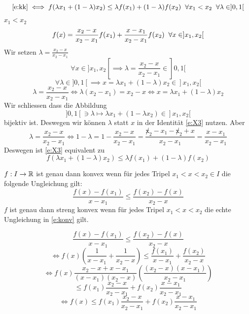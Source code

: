 \begin{Lem}
  \[\eqref{e:kk}\iff f(\lambda x_1+(1-\lambda)x_2)\leq\lambda f(x_1)+(1-\lambda)f(x_2)\hspace{2mm}\forall x_1 < x_2\hspace{2mm}\forall \lambda\in ]0,1[\]
\end{Lem}
\begin{Bew}
  $x_1<x_2$
\begin{equation}\label{e:X3}
f(x)=\frac{x_2-x}{x_2-x_1}f(x_1)+\frac{x-x_1}{x_2-x_1}f(x_2)\hspace{2mm}
\forall x\in ]x_1,x_2[
\end{equation}
Wir setzen $\lambda = \frac{x_2-x}{x_2-x_1}$
  \[\forall x\in ]x_1,x_2[\implies \lambda=\frac{x_2-x}{x_2-x_1}\in ]0,1[\]
  \[\forall \lambda\in ]0,1[\implies x=\lambda x_1+(1-\lambda)x_2\in ]x_1,x_2[\]
  \[\lambda=\frac{x_2-x}{x_2-x_1}\iff \lambda(x_2-x_1)=x_2-x\iff x=\lambda x_1+(1-\lambda)x_2\]
Wir schliessen dass die Abbildung
  \[ ]0,1[\ni\lambda\mapsto \lambda x_1+(1-\lambda x_2)\in  ]x_1,x_2[\]
bijektiv ist. Deswegen wir k\"onnen $\lambda$ statt $x$ in der Identit\"at \eqref{e:X3}
nutzen.
Aber 
\[\lambda=\frac{x_2-x}{x_2-x_1}\iff 1-\lambda=1-\frac{x_2-x}{x_2-x_1}
=\frac{\not x_2-x_1-\not x_2+x}{x_2-x_1}=\frac{x-x_1}{x_2-x_1}\]
Deswegen ist \eqref{e:X3} equivalent zu
  \[f(\lambda x_1+(1-\lambda)x_2)\leq \lambda f(x_1)+(1-\lambda)f(x_2)\]
\end{Bew}
\begin{Lem}\label{l:1011293}
  $f:I\to \mathbb{R}$ ist genau dann konvex wenn für jedes Tripel $x_1<x<x_2\in I$ die folgende Ungleichung gilt:
\begin{equation}\label{e:konv}
\frac{f(x)-f(x_1)}{x-x_1}\leq \frac{f(x_2)-f(x)}{x_2-x}
\end{equation}
$f$ ist genau dann streng konvex wenn f\"ur jedes Tripel $x_1<x<x_2$ die echte Ungleichung
in \eqref{e:konv} gilt.
\end{Lem}
\begin{Bew}
  \[\frac{f(x)-f(x_1)}{x-x_1}\leq \frac{f(x_2)-f(x)}{x_2-x}\]
  \[\iff f(x)\left( \frac{1}{x-x_1}+\frac{1}{x_2-x} \right)\leq \frac{f(x_1)}{x-x_1}+\frac{f(x_2)}{x_2-x}\]
  \[\iff f(x)\frac{x_2-x+x-x_1}{(x-x_1)(x_2-x)}\left( \frac{(x_2-x)(x-x_1)}{x_2-x_1} \right)\]
  \[ \leq f(x_1)\frac{x_2-x}{x_2-x_1}+f(x_2)\frac{x-x_1}{x_2-x_1}\]
  \[\iff f(x)\leq f(x_1)\frac{x_2-x}{x_2-x_1}+f(x_2)\frac{x-x_1}{x_2-x_1}\]
\end{Bew}
